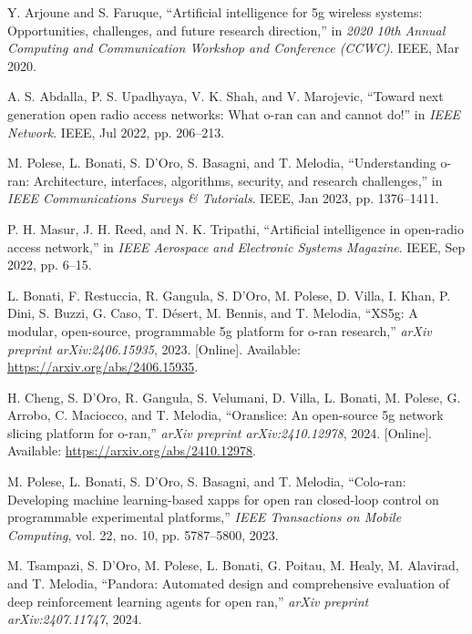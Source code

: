 \begin{thebibliography}{99}

Y. Arjoune and S. Faruque, “Artificial intelligence for 5g wireless systems: Opportunities, challenges, and future research direction,” in \textit{2020 10th Annual Computing and Communication Workshop and Conference (CCWC)}. IEEE, Mar 2020.

A. S. Abdalla, P. S. Upadhyaya, V. K. Shah, and V. Marojevic, “Toward next generation open radio access networks: What o-ran can and cannot do!” in \textit{IEEE Network}. IEEE, Jul 2022, pp. 206–213.

M. Polese, L. Bonati, S. D’Oro, S. Basagni, and T. Melodia, “Understanding o-ran: Architecture, interfaces, algorithms, security, and research challenges,” in \textit{IEEE Communications Surveys \& Tutorials}. IEEE, Jan 2023, pp. 1376–1411.

P. H. Masur, J. H. Reed, and N. K. Tripathi, “Artificial intelligence in open-radio access network,” in \textit{IEEE Aerospace and Electronic Systems Magazine}. IEEE, Sep 2022, pp. 6–15.

L. Bonati, F. Restuccia, R. Gangula, S. D’Oro, M. Polese, D. Villa, I. Khan, P. Dini, S. Buzzi, G. Caso, T. Désert, M. Bennis, and T. Melodia, “XS5g: A modular, open-source, programmable 5g platform for o-ran research,” \textit{arXiv preprint arXiv:2406.15935}, 2023. [Online]. Available: \url{https://arxiv.org/abs/2406.15935}.

H. Cheng, S. D’Oro, R. Gangula, S. Velumani, D. Villa, L. Bonati, M. Polese, G. Arrobo, C. Maciocco, and T. Melodia, “Oranslice: An open-source 5g network slicing platform for o-ran,” \textit{arXiv preprint arXiv:2410.12978}, 2024. [Online]. Available: \url{https://arxiv.org/abs/2410.12978}.

M. Polese, L. Bonati, S. D’Oro, S. Basagni, and T. Melodia, “Colo-ran: Developing machine learning-based xapps for open ran closed-loop control on programmable experimental platforms,” \textit{IEEE Transactions on Mobile Computing}, vol. 22, no. 10, pp. 5787–5800, 2023.

M. Tsampazi, S. D’Oro, M. Polese, L. Bonati, G. Poitau, M. Healy, M. Alavirad, and T. Melodia, “Pandora: Automated design and comprehensive evaluation of deep reinforcement learning agents for open ran,” \textit{arXiv preprint arXiv:2407.11747}, 2024.


\end{thebibliography}
